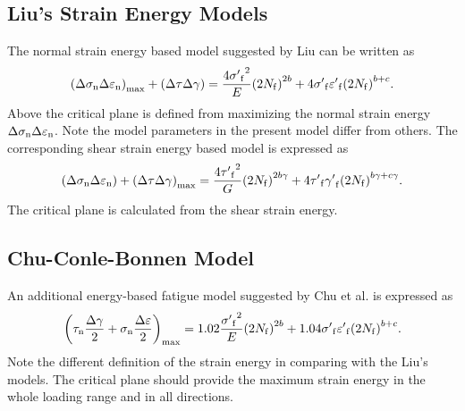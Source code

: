 \subsection{Liu's Strain Energy Models}
\noindent
The normal strain energy based model suggested by Liu  \cite{Socie2000} can be written as
\begin{equation}
{\left( {\Delta {\sigma _{\rm n}}\Delta {\varepsilon _{\rm n}}} \right)_{\max }} + \left( {\Delta \tau \Delta \gamma } \right) = \frac{{4{{\sigma '}_{\rm f}}^2}}{E}{\left( {2{N_{\rm f}}} \right)^{2b}} + 4{{\sigma '}_{\rm f}}{{\varepsilon '}_{\rm f}}{\left( {2{N_{\rm f}}} \right)^{b + c}}.
\label{Equ:Liu1_model}
\end{equation}
Above the critical plane is defined from maximizing the normal strain energy ${\Delta {\sigma _{\rm n}}\Delta {\varepsilon _{\rm n}}}$. Note the model parameters in the present model differ from others. The corresponding shear strain energy based model is expressed as
\begin{equation}
\left( {\Delta {\sigma _{\rm n}}\Delta {\varepsilon _{\rm n}}} \right) + {\left( {\Delta \tau \Delta \gamma } \right)_{\max }} = \frac{{4{{\tau '}_{\rm f}}^2}}{G}{\left( {2{N_{\rm f}}} \right)^{2b\gamma }} + 4{{\tau '}_{\rm f}}{{\gamma '}_{\rm f}}{\left( {2{N_{\rm f}}} \right)^{b\gamma  + c\gamma }}.
\label{Equ:Liu2_model}
\end{equation}
The critical plane is calculated from the shear strain energy.

\subsection{Chu-Conle-Bonnen Model}
\noindent
An additional energy-based fatigue model suggested by Chu et al. \cite{Socie2000} is expressed as
\begin{equation}
{\left( {{\tau _{\rm n}}\frac{{\Delta \gamma }}{2} + {\sigma _{\rm n }}\frac{{\Delta \varepsilon }}{2}} \right)_{\max }} = 1.02\frac{{{{\sigma '}_{\rm f}}^2}}{E}{\left( {2{N_{\rm f}}} \right)^{2b}} + 1.04{{\sigma '}_{\rm f}}{{\varepsilon '}_{\rm f}}{\left( {2{N_{\rm f}}} \right)^{b + c}}.
\label{Equ:CCB_model}
\end{equation}
Note the different definition of the strain energy in comparing with the Liu's models. The critical plane should provide the maximum strain energy in the whole loading range and in all directions.
 

